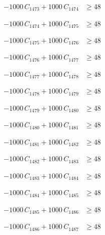 \documentclass[a4paper,11pt]{article}
\begin{document}
\begin{align}
-1000\,C_{1473} + 1000\,C_{1474} &\geq 48 \nonumber
\end{align}

\begin{align}
-1000\,C_{1474} + 1000\,C_{1475} &\geq 48 \nonumber
\end{align}

\begin{align}
-1000\,C_{1475} + 1000\,C_{1476} &\geq 48 \nonumber
\end{align}

\begin{align}
-1000\,C_{1476} + 1000\,C_{1477} &\geq 48 \nonumber
\end{align}

\begin{align}
-1000\,C_{1477} + 1000\,C_{1478} &\geq 48 \nonumber
\end{align}

\begin{align}
-1000\,C_{1478} + 1000\,C_{1479} &\geq 48 \nonumber
\end{align}

\begin{align}
-1000\,C_{1479} + 1000\,C_{1480} &\geq 48 \nonumber
\end{align}

\begin{align}
-1000\,C_{1480} + 1000\,C_{1481} &\geq 48 \nonumber
\end{align}

\begin{align}
-1000\,C_{1481} + 1000\,C_{1482} &\geq 48 \nonumber
\end{align}

\begin{align}
-1000\,C_{1482} + 1000\,C_{1483} &\geq 48 \nonumber
\end{align}

\begin{align}
-1000\,C_{1483} + 1000\,C_{1484} &\geq 48 \nonumber
\end{align}

\begin{align}
-1000\,C_{1484} + 1000\,C_{1485} &\geq 48 \nonumber
\end{align}

\begin{align}
-1000\,C_{1485} + 1000\,C_{1486} &\geq 48 \nonumber
\end{align}

\begin{align}
-1000\,C_{1486} + 1000\,C_{1487} &\geq 48 \nonumber
\end{align}
\end{document}
